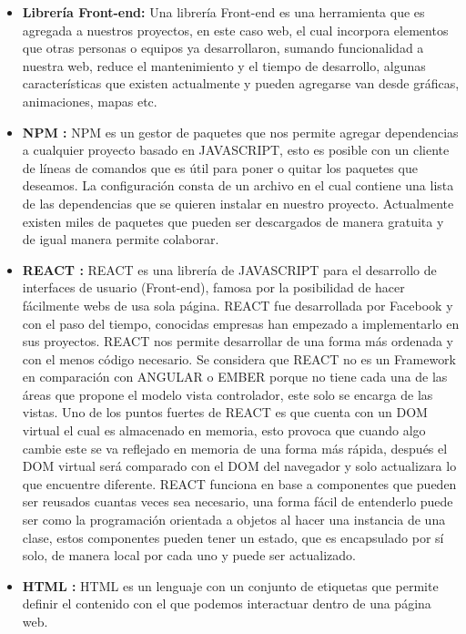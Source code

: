 \begin{itemize}

	\item \textbf{Librería Front-end:} Una librería Front-end es una herramienta que es agregada a nuestros proyectos, en este caso web, el cual incorpora elementos que otras personas o equipos ya desarrollaron, sumando funcionalidad a nuestra web, reduce el mantenimiento y el tiempo de desarrollo, algunas características que existen actualmente y pueden agregarse van desde gráficas, animaciones, mapas etc. 
  
   \item \textbf{NPM :} NPM es un gestor de paquetes que nos permite agregar dependencias a cualquier proyecto basado en JAVASCRIPT, esto es posible con un cliente de líneas de comandos que es útil para poner o quitar los paquetes que deseamos. La configuración consta de un archivo en el cual contiene una lista de las dependencias que se quieren instalar en nuestro proyecto. Actualmente existen miles de paquetes que pueden ser descargados de manera gratuita y de igual manera permite colaborar. 
   
   \item \textbf{ REACT :} REACT es una librería de JAVASCRIPT para el desarrollo de interfaces de usuario (Front-end), famosa por la posibilidad de hacer fácilmente webs de usa sola página. REACT fue desarrollada por Facebook y con el paso del tiempo, conocidas empresas han empezado a implementarlo en sus proyectos. 
REACT nos permite desarrollar de una forma más ordenada y con el menos código necesario. 
Se considera que REACT no es un Framework en comparación con ANGULAR o EMBER porque no tiene cada una de las áreas que propone el modelo vista controlador, este solo se encarga de las vistas. 
Uno de los puntos fuertes de REACT es que cuenta con un DOM virtual el cual es almacenado en memoria, esto provoca que cuando algo cambie este se va reflejado en memoria de una forma más rápida, después el DOM virtual será comparado con el DOM del navegador y solo actualizara lo que encuentre diferente. 
REACT funciona en base a componentes que pueden ser reusados cuantas veces sea necesario, una forma fácil de entenderlo puede ser como la programación orientada a objetos al hacer una instancia de una clase, estos componentes pueden tener un estado, que es encapsulado por sí solo, de manera local por cada uno y puede ser actualizado.  

   \item \textbf{HTML  :}   HTML es un lenguaje con un conjunto de etiquetas que permite definir el contenido con el que podemos interactuar dentro de una página web. 
   

\end{itemize}
